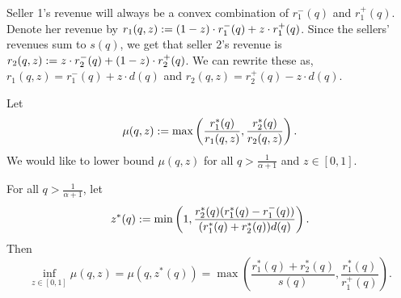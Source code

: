 Seller 1's revenue will always be a convex combination of $r_1^-(q)$ and $r_1^+(q)$.
Denote her revenue by $r_1(q, z) := (1-z) \cdot r_1^-(q) + z \cdot r_1^+(q)$.
Since the sellers' revenues sum to $s(q)$, we get that seller 2's revenue is
$r_2(q, z) := z \cdot r_2^-(q) + (1-z) \cdot r_2^+(q)$.
We can rewrite these as, $r_1(q, z) = r_1^-(q) + z \cdot d(q)$
and $r_2(q, z) = r_2^+(q) - z \cdot d(q)$.

Let
\[ \mu(q, z) := \max\left(\frac{r_1^*(q)}{r_1(q, z)}, \frac{r_2^*(q)}{r_2(q, z)}\right). \]
We would like to lower bound $\mu(q, z)$ for all $q > \frac{1}{\alpha+1}$ and $z \in [0, 1]$.

\begin{lemma}
\label{thm:4.1}
For all $q > \frac{1}{\alpha+1}$, let
\[ z^*(q) := \min\left(1, \frac{r_2^*(q)(r_1^*(q) - r_1^-(q))}{(r_1^*(q) + r_2^*(q))d(q)}\right). \]
Then
\[ \inf_{z \in [0, 1]} \mu(q, z) = \mu(q, z^*(q))
    = \max\left(\frac{r_1^*(q)+r_2^*(q)}{s(q)}, \frac{r_1^*(q)}{r_1^+(q)}\right). \]
\end{lemma}
